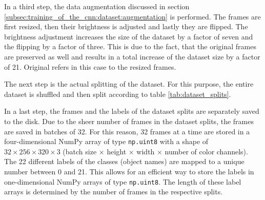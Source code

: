 In a third step, the data augmentation discussed in section \ref{subsec:training_of_the_cnn:dataset:augmentation} is performed.
The frames are first resized, then their brightness is adjusted and lastly they are flipped.
The brightness adjustment increases the size of the dataset by a factor of seven and the flipping by a factor of three.
This is due to the fact, that the original frames are preserved as well and results in a total increase of the dataset size by a factor of \num{21}.
Original refers in this case to the resized frames.

The next step is the actual splitting of the dataset.
For this purpose, the entire dataset is shuffled and then split according to table \ref{tab:dataset_splits}.

In a last step, the frames and the labels of the dataset splits are separately saved to the disk.
Due to the sheer number of frames in the dataset splits, the frames are saved in batches of \num{32}.
For this reason, \num{32} frames at a time are stored in a four-dimensional NumPy array of type \texttt{np.uint8} with a shape of $32\times 256\times 320\times 3$ (batch size $\times$ height $\times$ width $\times$ number of color channels).
The \num{22} different labels of the classes (object names) are mapped to a unique number between \num{0} and \num{21}.
This allows for an efficient way to store the labels in one-dimensional NumPy arrays of type \texttt{np.uint8}.
The length of these label arrays is determined by the number of frames in the respective splits.

